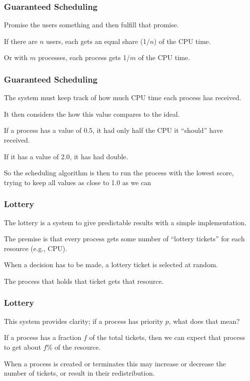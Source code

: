 \begin{frame}
\frametitle{Guaranteed Scheduling}

Promise the users something and then fulfill that promise. 

If there are $n$ users, each gets an equal share (1/$n$) of the CPU time. 

Or with $m$ processes, each process gets 1/$m$ of the CPU time.


\end{frame}

\begin{frame}
\frametitle{Guaranteed Scheduling}

The system must keep track of how much CPU time each process has received. 

It then considers the how this value compares to the ideal. 

If a process has a value of 0.5, it had only half the CPU it ``should'' have received. 

If it has a value of 2.0, it has had double. 

So the scheduling algorithm is then to run the process with the lowest score, trying to keep all values as close to 1.0 as we can

\end{frame}

\begin{frame}
\frametitle{Lottery}

The lottery is a system to give predictable results with a simple implementation. 

The premise is that every process gets some number of ``lottery tickets'' for each resource (e.g., CPU). 

When a decision has to be made, a lottery ticket is selected at random. 

The process that holds that ticket gets that resource.

\end{frame}

\begin{frame}
\frametitle{Lottery}

This system provides clarity; if a process has priority $p$, what does that mean? 

If a process has a fraction $f$ of the total tickets, then we can expect that process to get about $f$\% of the resource. 

When a process is created or terminates this may increase or decrease the number of tickets, or result in their redistribution.


\end{frame}

